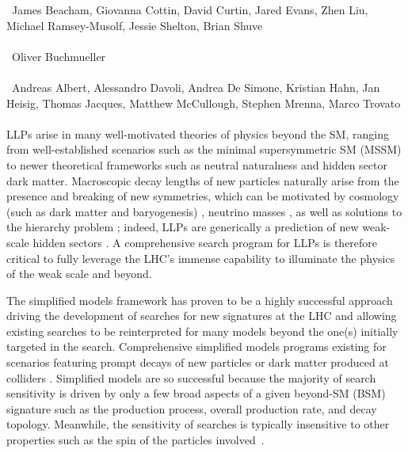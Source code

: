 ~James Beacham, Giovanna Cottin, David Curtin, Jared Evans, Zhen Liu, Michael Ramsey-Musolf, Jessie Shelton, Brian Shuve\\
\text{ \; }\\
~Oliver Buchmueller\\
\text{ \; }\\
~Andreas Albert, Alessandro Davoli, Andrea De Simone, Kristian Hahn, Jan Heisig, Thomas Jacques, Matthew McCullough, Stephen Mrenna, Marco Trovato
\text{ \; }\\
\text{ \; }\\


\noindent LLPs arise in many well-motivated theories of physics beyond the SM, ranging from  well-established scenarios such as the minimal supersymmetric  SM (MSSM) to newer theoretical frameworks such as neutral naturalness and hidden sector dark matter.  Macroscopic decay lengths of new particles naturally arise from the presence and breaking of new symmetries, which can be motivated by cosmology (such as dark matter and baryogenesis) \cite{Bouquet:1986mq, Campbell:1990fa, Cui:2012jh, Barry:2013nva, Cui:2014twa, Ipek:2016bpf,Baumgart:2009tn, Kaplan:2009ag,
  Chan:2011aa, Dienes:2011ja, Dienes:2012yz, Kim:2013ivd}, neutrino masses \cite{Helo:2013esa, Antusch:2016vyf,Graesser:2007yj, Graesser:2007pc, Izaguirre:2015pga,Maiezza:2015lza, Batell:2016zod,Cottin:2018kmq,Nemevsek:2018bbt}, as well as solutions to the hierarchy problem  \cite{Giudice:1998bp,Burdman:2006tz, Cai:2008au, Chacko:2005pe,Fan:2011yu,Barbier:2004ez, Csaki:2013jza,Arvanitaki:2012ps, ArkaniHamed:2012gw}; indeed, LLPs are generically a prediction of new weak-scale hidden sectors \cite{Chen:1995yu,Thomas:1998wy,Feng:1999fu,Strassler:2006im,Strassler:2006ri,Strassler:2006qa,Han:2007ae,Strassler:2008bv,Strassler:2008fv}.  A comprehensive search program for LLPs is therefore critical to fully leverage the LHC's immense capability to illuminate the physics of the weak scale and beyond. 
  
 The simplified models framework has proven to be a highly successful approach driving the development of  searches for new signatures at the LHC and allowing existing searches to be reinterpreted for many models beyond the one(s) initially targeted in the search. Comprehensive simplified models programs existing for scenarios featuring prompt decays of new particles \cite{Alves:2011wf} or dark matter produced at colliders \cite{Abdallah:2015ter}.  Simplified models are so successful because the majority of search sensitivity is driven by only a few broad aspects of a given beyond-SM (BSM) signature such as the production process, overall production rate, and decay topology. Meanwhile, the sensitivity of searches is typically insensitive to other properties such as the spin of the particles involved~\cite{Edelhauser:2015ksa,Edelhauser:2014ena,Arina:2015uea,Kraml:2016eti}.


